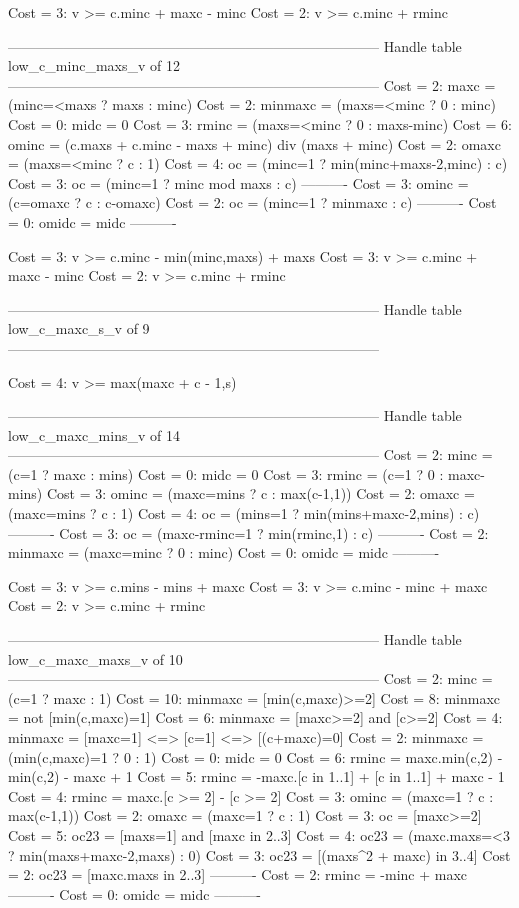 Cost =  3:  v >= c.minc + maxc - minc
Cost =  2:  v >= c.minc + rminc

--------------------------------------------------------------------------------
Handle table low_c_minc_maxs_v of 12
--------------------------------------------------------------------------------
Cost =  2:  maxc    = (minc=<maxs ? maxs : minc)
Cost =  2:  minmaxc = (maxs=<minc ? 0 : minc)
Cost =  0:  midc    = 0
Cost =  3:  rminc   = (maxs=<minc ? 0 : maxs-minc)
Cost =  6:  ominc   = (c.maxs + c.minc - maxs + minc) div (maxs + minc)
Cost =  2:  omaxc   = (maxs=<minc ? c : 1)
Cost =  4:  oc      = (minc=1 ? min(minc+maxs-2,minc) : c)
Cost =  3:  oc      = (minc=1 ? minc mod maxs : c)
----------
Cost =  3:  ominc   = (c=omaxc ? c : c-omaxc)
Cost =  2:  oc      = (minc=1 ? minmaxc : c)
----------
Cost =  0:  omidc   = midc
----------

Cost =  3:  v >= c.minc - min(minc,maxs) + maxs
Cost =  3:  v >= c.minc + maxc - minc
Cost =  2:  v >= c.minc + rminc

--------------------------------------------------------------------------------
Handle table low_c_maxc_s_v of 9
--------------------------------------------------------------------------------

Cost =  4:  v >= max(maxc + c - 1,s)

--------------------------------------------------------------------------------
Handle table low_c_maxc_mins_v of 14
--------------------------------------------------------------------------------
Cost =  2:  minc    = (c=1 ? maxc : mins)
Cost =  0:  midc    = 0
Cost =  3:  rminc   = (c=1 ? 0 : maxc-mins)
Cost =  3:  ominc   = (maxc=mins ? c : max(c-1,1))
Cost =  2:  omaxc   = (maxc=mins ? c : 1)
Cost =  4:  oc      = (mins=1 ? min(mins+maxc-2,mins) : c)
----------
Cost =  3:  oc      = (maxc-rminc=1 ? min(rminc,1) : c)
----------
Cost =  2:  minmaxc = (maxc=minc ? 0 : minc)
Cost =  0:  omidc   = midc
----------

Cost =  3:  v >= c.mins - mins + maxc
Cost =  3:  v >= c.minc - minc + maxc
Cost =  2:  v >= c.minc + rminc

--------------------------------------------------------------------------------
Handle table low_c_maxc_maxs_v of 10
--------------------------------------------------------------------------------
Cost =  2:  minc    = (c=1 ? maxc : 1)
Cost = 10:  minmaxc = [min(c,maxc)>=2]
Cost =  8:  minmaxc = not [min(c,maxc)=1]
Cost =  6:  minmaxc = [maxc>=2] and [c>=2]
Cost =  4:  minmaxc = [maxc=1] <=> [c=1] <=> [(c+maxc)=0]
Cost =  2:  minmaxc = (min(c,maxc)=1 ? 0 : 1)
Cost =  0:  midc    = 0
Cost =  6:  rminc   = maxc.min(c,2) - min(c,2) - maxc + 1
Cost =  5:  rminc   = -maxc.[c in 1..1] + [c in 1..1] + maxc - 1
Cost =  4:  rminc   = maxc.[c >= 2] - [c >= 2]
Cost =  3:  ominc   = (maxc=1 ? c : max(c-1,1))
Cost =  2:  omaxc   = (maxc=1 ? c : 1)
Cost =  3:  oc      = [maxc>=2]
Cost =  5:  oc23    = [maxs=1] and [maxc in 2..3]
Cost =  4:  oc23    = (maxc.maxs=<3 ? min(maxs+maxc-2,maxs) : 0)
Cost =  3:  oc23    = [(maxs^2 + maxc) in 3..4]
Cost =  2:  oc23    = [maxc.maxs in 2..3]
----------
Cost =  2:  rminc   = -minc + maxc
----------
Cost =  0:  omidc   = midc
----------

